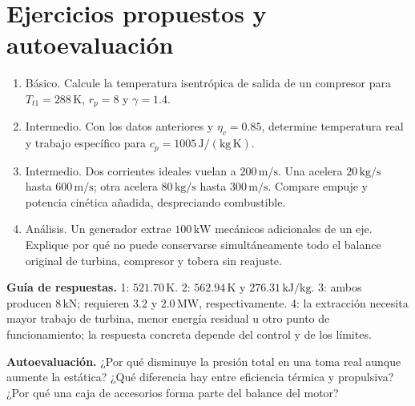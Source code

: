 \section{Ejercicios propuestos y autoevaluación}
\begin{enumerate}
\item Básico. Calcule la temperatura isentrópica de salida de un compresor para $T_{t1}=288\,\mathrm{K}$, $r_p=8$ y $\gamma=1.4$.
\item Intermedio. Con los datos anteriores y $\eta_c=0.85$, determine temperatura real y trabajo específico para $c_p=1005\,\mathrm{J/(kg\,K)}$.
\item Intermedio. Dos corrientes ideales vuelan a $200\,\mathrm{m/s}$. Una acelera $20\,\mathrm{kg/s}$ hasta $600\,\mathrm{m/s}$; otra acelera $80\,\mathrm{kg/s}$ hasta $300\,\mathrm{m/s}$. Compare empuje y potencia cinética añadida, despreciando combustible.
\item Análisis. Un generador extrae $100\,\mathrm{kW}$ mecánicos adicionales de un eje. Explique por qué no puede conservarse simultáneamente todo el balance original de turbina, compresor y tobera sin reajuste.
\end{enumerate}
\textbf{Guía de respuestas.} 1: $521.70\,\mathrm{K}$. 2: $562.94\,\mathrm{K}$ y $276.31\,\mathrm{kJ/kg}$. 3: ambos producen $8\,\mathrm{kN}$; requieren $3.2$ y $2.0\,\mathrm{MW}$, respectivamente. 4: la extracción necesita mayor trabajo de turbina, menor energía residual u otro punto de funcionamiento; la respuesta concreta depende del control y de los límites.

\textbf{Autoevaluación.} ¿Por qué disminuye la presión total en una toma real aunque aumente la estática? ¿Qué diferencia hay entre eficiencia térmica y propulsiva? ¿Por qué una caja de accesorios forma parte del balance del motor?
